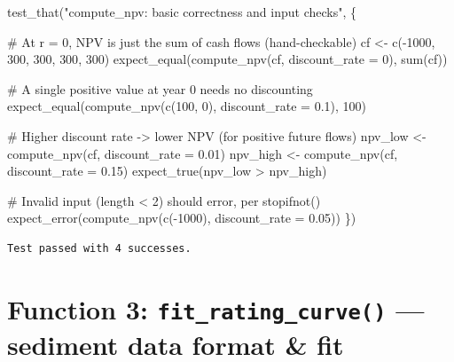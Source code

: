 \documentclass[
  11pt,
  letterpaper,
  DIV=11,
  numbers=noendperiod]{scrartcl}
\newenvironment{Shaded}{\begin{snugshade}}{\end{snugshade}}
\newcommand{\AttributeTok}[1]{\textcolor[rgb]{0.40,0.45,0.13}{#1}}
\newcommand{\CommentTok}[1]{\textcolor[rgb]{0.37,0.37,0.37}{#1}}
\newcommand{\DecValTok}[1]{\textcolor[rgb]{0.68,0.00,0.00}{#1}}
\newcommand{\FloatTok}[1]{\textcolor[rgb]{0.68,0.00,0.00}{#1}}
\newcommand{\FunctionTok}[1]{\textcolor[rgb]{0.28,0.35,0.67}{#1}}
\newcommand{\NormalTok}[1]{\textcolor[rgb]{0.00,0.23,0.31}{#1}}
\newcommand{\OtherTok}[1]{\textcolor[rgb]{0.00,0.23,0.31}{#1}}
\newcommand{\SpecialCharTok}[1]{\textcolor[rgb]{0.37,0.37,0.37}{#1}}
\newcommand{\StringTok}[1]{\textcolor[rgb]{0.13,0.47,0.30}{#1}}
\begin{document}
\begin{Shaded}
\begin{Highlighting}[]
\FunctionTok{test\_that}\NormalTok{(}\StringTok{"compute\_npv: basic correctness and input checks"}\NormalTok{, \{}

  \CommentTok{\# At r = 0, NPV is just the sum of cash flows (hand{-}checkable)}
\NormalTok{  cf }\OtherTok{\textless{}{-}} \FunctionTok{c}\NormalTok{(}\SpecialCharTok{{-}}\DecValTok{1000}\NormalTok{, }\DecValTok{300}\NormalTok{, }\DecValTok{300}\NormalTok{, }\DecValTok{300}\NormalTok{, }\DecValTok{300}\NormalTok{)}
  \FunctionTok{expect\_equal}\NormalTok{(}\FunctionTok{compute\_npv}\NormalTok{(cf, }\AttributeTok{discount\_rate =} \DecValTok{0}\NormalTok{), }\FunctionTok{sum}\NormalTok{(cf))}

  \CommentTok{\# A single positive value at year 0 needs no discounting}
  \FunctionTok{expect\_equal}\NormalTok{(}\FunctionTok{compute\_npv}\NormalTok{(}\FunctionTok{c}\NormalTok{(}\DecValTok{100}\NormalTok{, }\DecValTok{0}\NormalTok{), }\AttributeTok{discount\_rate =} \FloatTok{0.1}\NormalTok{), }\DecValTok{100}\NormalTok{)}

  \CommentTok{\# Higher discount rate {-}\textgreater{} lower NPV (for positive future flows)}
\NormalTok{  npv\_low  }\OtherTok{\textless{}{-}} \FunctionTok{compute\_npv}\NormalTok{(cf, }\AttributeTok{discount\_rate =} \FloatTok{0.01}\NormalTok{)}
\NormalTok{  npv\_high }\OtherTok{\textless{}{-}} \FunctionTok{compute\_npv}\NormalTok{(cf, }\AttributeTok{discount\_rate =} \FloatTok{0.15}\NormalTok{)}
  \FunctionTok{expect\_true}\NormalTok{(npv\_low }\SpecialCharTok{\textgreater{}}\NormalTok{ npv\_high)}

  \CommentTok{\# Invalid input (length \textless{} 2) should error, per stopifnot()}
  \FunctionTok{expect\_error}\NormalTok{(}\FunctionTok{compute\_npv}\NormalTok{(}\FunctionTok{c}\NormalTok{(}\SpecialCharTok{{-}}\DecValTok{1000}\NormalTok{), }\AttributeTok{discount\_rate =} \FloatTok{0.05}\NormalTok{))}
\NormalTok{\})}
\end{Highlighting}
\end{Shaded}

\begin{verbatim}
Test passed with 4 successes.
\end{verbatim}

\section{\texorpdfstring{Function 3: \texttt{fit\_rating\_curve()} ---
sediment data format \&
fit}{Function 3: fit\_rating\_curve() --- sediment data format \& fit}}\label{function-3-fit_rating_curve-sediment-data-format-fit}
\end{document}

